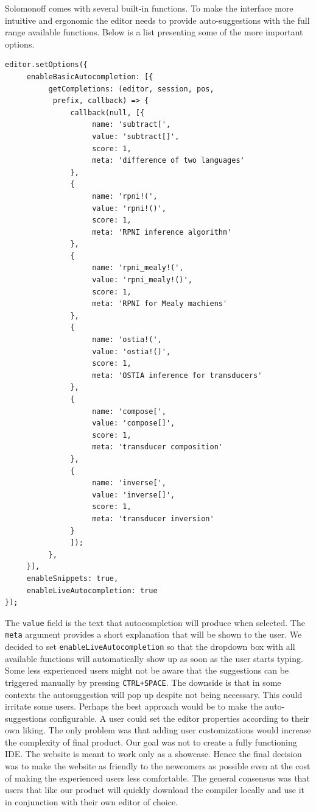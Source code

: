 Solomonoff comes with several built-in functions. To make the interface more intuitive and ergonomic the editor needs to provide auto-suggestions with the full range available functions. Below is a list presenting some of the more important options.
\begin{lstlisting}
editor.setOptions({
     enableBasicAutocompletion: [{
          getCompletions: (editor, session, pos,
           prefix, callback) => {
               callback(null, [{
                    name: 'subtract[',
                    value: 'subtract[]',
                    score: 1,
                    meta: 'difference of two languages'
               },
               {
                    name: 'rpni!(',
                    value: 'rpni!()',
                    score: 1,
                    meta: 'RPNI inference algorithm'
               },
               {
                    name: 'rpni_mealy!(',
                    value: 'rpni_mealy!()',
                    score: 1,
                    meta: 'RPNI for Mealy machiens'
               },
               {
                    name: 'ostia!(',
                    value: 'ostia!()',
                    score: 1,
                    meta: 'OSTIA inference for transducers'
               },
               {
                    name: 'compose[',
                    value: 'compose[]',
                    score: 1,
                    meta: 'transducer composition'
               },
               {
                    name: 'inverse[',
                    value: 'inverse[]',
                    score: 1,
                    meta: 'transducer inversion'
               }
               ]);
          },
     }],
     enableSnippets: true,
     enableLiveAutocompletion: true
});
\end{lstlisting}
The \texttt{value} field is the text that autocompletion will produce when selected. The \texttt{meta} argument provides a short explanation that will be shown to the user. We decided to set \texttt{enableLiveAutocompletion} so that the dropdown box with all available functions will automatically show up as soon as the user starts typing. Some less experienced users might not be aware that the suggestions can be triggered manually by pressing \texttt{CTRL+SPACE}. The downside is that in some contexts the autosuggestion will pop up  despite not being necessary. This could irritate some users. Perhaps the best approach would be to make the auto-suggestions configurable. A user could set the editor properties according to their own liking. The only problem was that adding user customizations would increase the complexity of final product. Our goal was not to create a fully functioning IDE. The website is meant to work only as a showcase. Hence the final decision was to make the website as friendly to the newcomers as possible even at the cost of making the experienced users less comfortable. The general consensus was that users that like our product will quickly download the compiler locally and use it in conjunction with their own editor of choice. 

